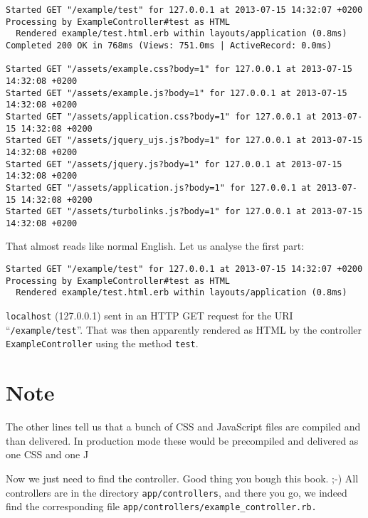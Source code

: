 \documentclass[a4paper]{book}
\begin{document}
\begin{shaded}\begin{verbatim}
Started GET "/example/test" for 127.0.0.1 at 2013-07-15 14:32:07 +0200
Processing by ExampleController#test as HTML
  Rendered example/test.html.erb within layouts/application (0.8ms)
Completed 200 OK in 768ms (Views: 751.0ms | ActiveRecord: 0.0ms)

Started GET "/assets/example.css?body=1" for 127.0.0.1 at 2013-07-15 14:32:08 +0200
Started GET "/assets/example.js?body=1" for 127.0.0.1 at 2013-07-15 14:32:08 +0200
Started GET "/assets/application.css?body=1" for 127.0.0.1 at 2013-07-15 14:32:08 +0200
Started GET "/assets/jquery_ujs.js?body=1" for 127.0.0.1 at 2013-07-15 14:32:08 +0200
Started GET "/assets/jquery.js?body=1" for 127.0.0.1 at 2013-07-15 14:32:08 +0200
Started GET "/assets/application.js?body=1" for 127.0.0.1 at 2013-07-15 14:32:08 +0200
Started GET "/assets/turbolinks.js?body=1" for 127.0.0.1 at 2013-07-15 14:32:08 +0200
\end{verbatim}\end{shaded}

That almost reads like normal English. Let us analyse the first part:

\begin{shaded}\begin{verbatim}
Started GET "/example/test" for 127.0.0.1 at 2013-07-15 14:32:07 +0200
Processing by ExampleController#test as HTML
  Rendered example/test.html.erb within layouts/application (0.8ms)
\end{verbatim}\end{shaded}

\texttt{localhost} (127.0.0.1) sent in an HTTP GET request for the URI “\texttt{/example/test}”. That was then apparently rendered as HTML by the controller \texttt{ExampleController} using the method \texttt{test}.

\section{Note}\label{note-15}

The other lines tell us that a bunch of CSS and JavaScript files are compiled and than delivered. In production mode these would be precompiled and delivered as one CSS and one J

Now we just need to find the controller. Good thing you bough this book. ;-) All controllers are in the directory \texttt{app/controllers}, and there you go, we indeed find the corresponding file \texttt{app/controllers/example\_controller.rb.}
\end{document}
